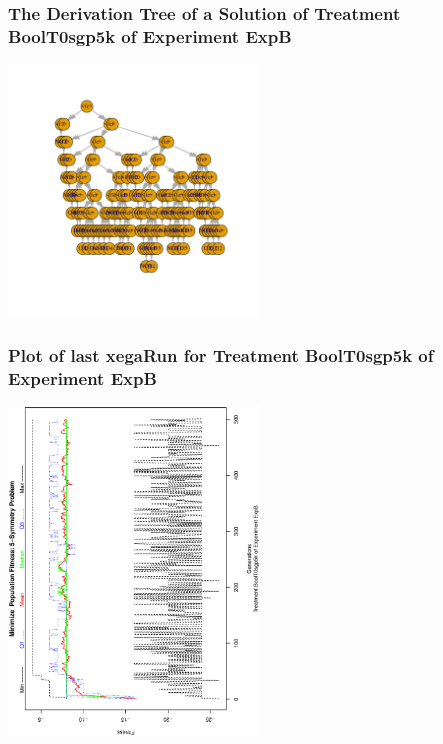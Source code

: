 \documentclass[18pt,c]{beamer}
\begin{document}
 \begin{frame}
 \frametitle{ The Derivation Tree of a Solution of Treatment BoolT0sgp5k of Experiment ExpB }
 \begin{center}
\includegraphics[width=0.5\textwidth, angle=0]
{ExpBDerivationTreeFigure003.pdf}
 \end{center}
 \label{report/ExpBDerivationTreeFigure003.pdf}  
 \end{frame}

 \begin{frame}
 \frametitle{ Plot of last xegaRun for Treatment BoolT0sgp5k of Experiment ExpB }
 \begin{center}
\includegraphics[width=0.5\textwidth, angle=-90]
{ExpBPlotPopStatsFigure003.eps}
 \end{center}
 \label{report/ExpBPlotPopStatsFigure003.eps}  
 \end{frame}
\end{document}
